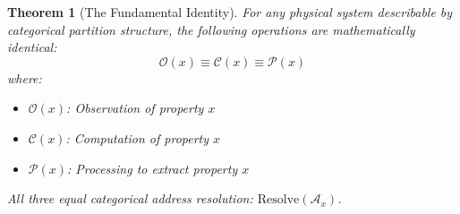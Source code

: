 \documentclass[twocolumn,10pt]{article}
\newtheorem{theorem}{Theorem}[section]
\theoremstyle{definition}
\theoremstyle{remark}
\newcommand{\cataddr}{\mathcal{A}}
\begin{document}
\begin{theorem}[The Fundamental Identity]
\label{thm:fundamental}
For any physical system describable by categorical partition structure, the following operations are mathematically identical:
\begin{equation}
    \mathcal{O}(x) \equiv \mathcal{C}(x) \equiv \mathcal{P}(x)
\end{equation}
where:
\begin{itemize}
    \item $\mathcal{O}(x)$: Observation of property $x$
    \item $\mathcal{C}(x)$: Computation of property $x$
    \item $\mathcal{P}(x)$: Processing to extract property $x$
\end{itemize}
All three equal categorical address resolution: $\text{Resolve}(\cataddr_x)$.
\end{theorem}
\end{document}
